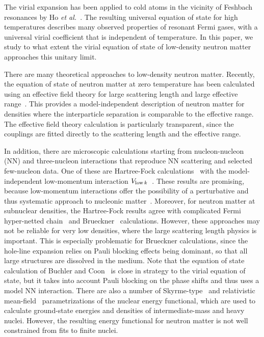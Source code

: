 \documentclass[aps,prc,twocolumn,showpacs,showkeys,amsmath,amssymb]{revtex4}
\newcommand{\vlk}{V_{{\rm low}\,k}}
\begin{document}
The virial expansion has been applied to cold atoms in the vicinity 
of Feshbach resonances by Ho {\it et al.}~\cite{Ho1,Ho2}.
The resulting universal equation of state for high temperatures
describes many observed properties of resonant Fermi gases, with 
a universal virial coefficient that is independent
of temperature. In this paper, we study to what extent the virial
equation of state of low-density neutron matter approaches this 
unitary limit.

There are many theoretical approaches to low-density neutron matter.  
Recently, the equation of state of neutron matter at zero temperature 
has been calculated using an effective field theory for large scattering 
length and large effective range~\cite{dEFT}. This provides a 
model-independent description of neutron matter for densities where 
the interparticle separation is comparable to the effective range. 
The effective field theory calculation is particularly transparent,
since the couplings are fitted directly to the scattering length and the 
effective range. 

In addition, there are microscopic calculations starting 
from nucleon-nucleon (NN) and three-nucleon interactions 
that reproduce NN scattering and selected few-nucleon data. One of 
these are Hartree-Fock calculations~\cite{RGnm} with the model-independent 
low-momentum interaction $\vlk$~\cite{Vlowk}. These results are
promising, because low-momentum interactions offer the possibility of a
perturbative and thus systematic approach to nucleonic matter~\cite{nucmat}.
Moreover, for neutron matter at subnuclear densities, the Hartree-Fock 
results agree with complicated Fermi hyper-netted chain~\cite{FP,APR} and 
Brueckner~\cite{Brueckner1,Brueckner2} calculations. However, these 
approaches may not be reliable for very low densities, where 
the large scattering length physics is important. This is
especially problematic for Brueckner calculations, since the hole-line 
expansion relies on Pauli blocking effects being dominant, so that all 
large structures are dissolved in the medium. Note that the equation of
state calculation of Buchler and Coon~\cite{BC} is close in strategy to 
the virial equation of state, but it takes into account Pauli blocking
on the phase shifts and thus uses a model NN interaction.
There are also a number of Skyrme-type~\cite{skyrme1,skyrme2,skyrme3} 
and relativistic mean-field~\cite{RMF1,RMF2,RMF3} 
parametrizations of the nuclear energy functional,
which are used to calculate ground-state energies and densities of
intermediate-mass and heavy nuclei. However, the resulting energy 
functional for neutron matter is not well constrained from fits to
finite nuclei.
\end{document}
